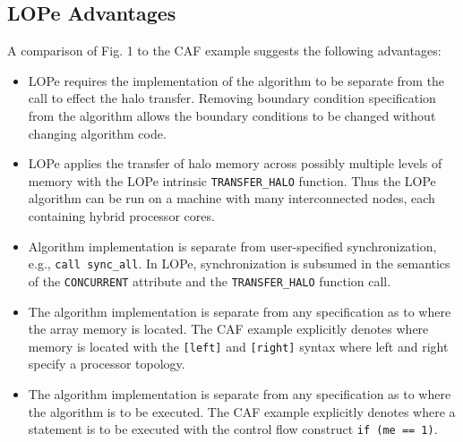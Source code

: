 
\subsection{LOPe Advantages}

A comparison of Fig. 1 to the CAF example suggests the following advantages:

\begin{itemize}

\item
LOPe requires the implementation of the algorithm to be separate from the call to effect the halo
transfer.  Removing boundary condition specification
from the algorithm allows the boundary conditions to be changed
without changing algorithm code.

\item
LOPe applies the transfer of halo memory across possibly multiple levels of memory with the LOPe
intrinsic \texttt{TRANSFER\_HALO} function.  Thus the LOPe algorithm can be run on a machine with
many interconnected nodes, each containing hybrid processor cores.

\item
Algorithm implementation is separate from user-specified synchronization, e.g., \texttt{call
  sync\_all}.  In LOPe, synchronization is subsumed in the semantics of the \texttt{CONCURRENT}
attribute and the \texttt{TRANSFER\_HALO} function call.

\item
The algorithm implementation is separate from any specification as to where the array
memory is located.  The CAF example explicitly denotes where memory is located with the
\texttt{[left]} and \texttt{[right]} syntax where left and right specify a processor
topology.

\item
The algorithm implementation is separate from any specification as to where the algorithm
is to be executed.  The CAF example explicitly denotes where a statement is to be executed
with the control flow construct \texttt{if (me == 1)}.


\end{itemize}
